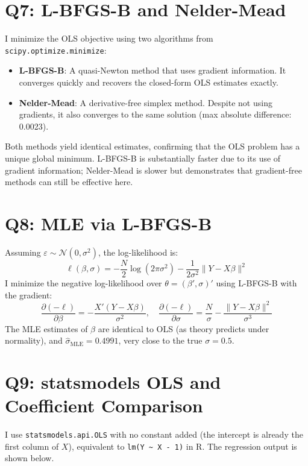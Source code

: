 \documentclass[12pt]{article}
\begin{document}
\section*{Q7: L-BFGS-B and Nelder-Mead}

I minimize the OLS objective using two algorithms from \texttt{scipy.optimize.minimize}:

\begin{itemize}
    \item \textbf{L-BFGS-B}: A quasi-Newton method that uses gradient information. It converges quickly and recovers the closed-form OLS estimates exactly.
    \item \textbf{Nelder-Mead}: A derivative-free simplex method. Despite not using gradients, it also converges to the same solution (max absolute difference: 0.0023).
\end{itemize}

Both methods yield identical estimates, confirming that the OLS problem has a unique global minimum. L-BFGS-B is substantially faster due to its use of gradient information; Nelder-Mead is slower but demonstrates that gradient-free methods can still be effective here.

\section*{Q8: MLE via L-BFGS-B}

Assuming $\varepsilon \sim \mathcal{N}(0, \sigma^2)$, the log-likelihood is:
\[
\ell(\beta, \sigma) = -\frac{N}{2}\log(2\pi\sigma^2) - \frac{1}{2\sigma^2}\|Y - X\beta\|^2
\]
I minimize the negative log-likelihood over $\theta = (\beta', \sigma)'$ using L-BFGS-B with the gradient:
\[
\frac{\partial (-\ell)}{\partial \beta} = -\frac{X'(Y - X\beta)}{\sigma^2}, \quad
\frac{\partial (-\ell)}{\partial \sigma} = \frac{N}{\sigma} - \frac{\|Y-X\beta\|^2}{\sigma^3}
\]
The MLE estimates of $\beta$ are identical to OLS (as theory predicts under normality), and $\hat{\sigma}_{\text{MLE}} = 0.4991$, very close to the true $\sigma = 0.5$.

\section*{Q9: statsmodels OLS and Coefficient Comparison}

I use \texttt{statsmodels.api.OLS} with no constant added (the intercept is already the first column of $X$), equivalent to \texttt{lm(Y \textasciitilde\ X - 1)} in R. The regression output is shown below.
\end{document}
